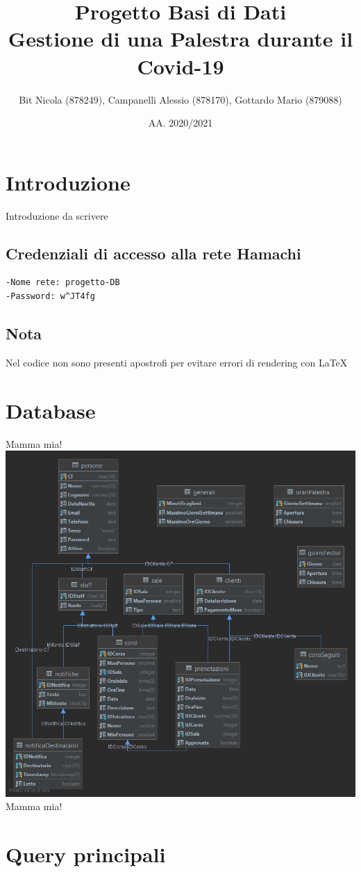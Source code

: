 \documentclass[a4paper,11pt,titlepage]{article}
\title{Progetto Basi di Dati\\Gestione di una Palestra durante il Covid-19}
\author{Bit Nicola (878249), Campanelli Alessio (878170), Gottardo Mario (879088)}
\date{AA. 2020/2021}
\begin{document}
\maketitle
\tableofcontents
\pagebreak
\section{Introduzione}
Introduzione da scrivere
\subsection{Credenziali di accesso alla rete Hamachi}
\begin{verbatim}
-Nome rete: progetto-DB
-Password: w^JT4fg
\end{verbatim}
\subsection{Nota}
Nel codice non sono presenti apostrofi per evitare errori di rendering con \LaTeX
\section{Database}
Mamma mia!
\\\includegraphics[width=\textwidth]{schema.png}\\
Mamma mia!
\section{Query principali}
\end{document}
